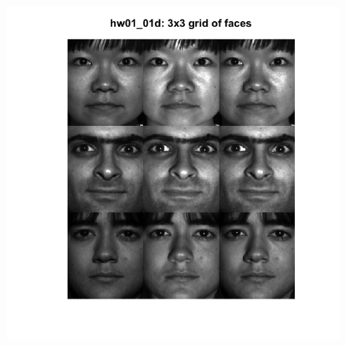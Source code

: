 \documentclass[11pt]{article}
\begin{document}
\begin{figure}[H]
	\centering
	\includegraphics[width=5in]{4_01d.png}
\end{figure}
\end{document}
